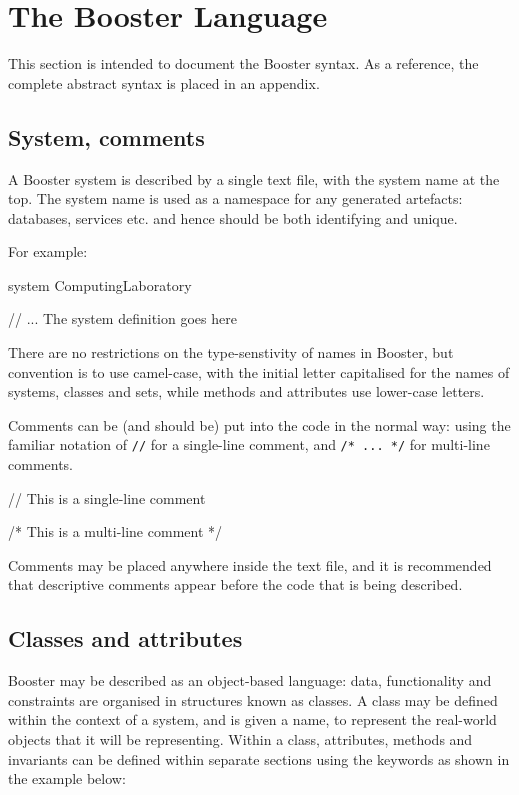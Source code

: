 \chapter{The Booster Language}

This section is intended to document the Booster syntax.  As a
reference, the complete abstract syntax is placed in an appendix.

\section{System, comments}
A Booster system is described by a single text file, with the system
name at the top.  The system name is used as a namespace for any
generated artefacts: databases, services etc. and hence should be both
identifying and unique.

For example:

\begin{code}
system ComputingLaboratory

// ... The system definition goes here
\end{code}

There are no restrictions on the type-senstivity of names in
Booster, but convention is to use camel-case, with the initial letter
capitalised for the names of systems, classes and sets, while methods
and attributes use lower-case letters.

Comments can be (and should be) put into the code in the normal way:
using the familiar notation of \verb|//| for a single-line comment,
and \verb|/* ... */| for multi-line comments.

\begin{code}
// This is a single-line comment

/* This is a multi-line 
comment */
\end{code}

Comments may be placed anywhere inside the text file, and it is
recommended that descriptive comments appear before the code that is
being described.


\section{Classes and attributes}

Booster may be described as an object-based language: data,
functionality and constraints are organised in structures known as
classes.  A class may be defined within the context of a system, and
is given a name, to represent the real-world objects that it will be
representing.  Within a class, attributes, methods and invariants can
be defined within separate sections using the keywords as shown in the
example below:

